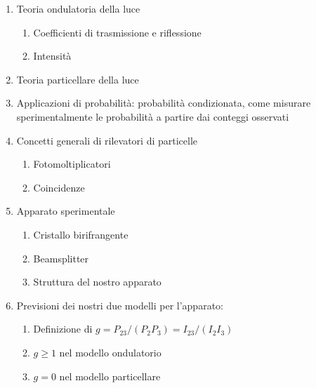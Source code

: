 \documentclass[main.tex]{subfiles}
\begin{document}
\begin{enumerate}
    \item Teoria ondulatoria della luce
    \begin{enumerate}
        \item Coefficienti di trasmissione e riflessione
        \item Intensità
    \end{enumerate}
    \item Teoria particellare della luce
    \item Applicazioni di probabilità: probabilità condizionata, come misurare sperimentalmente le probabilità a partire dai conteggi osservati
    \item Concetti generali di rilevatori di particelle
    \begin{enumerate}
        \item Fotomoltiplicatori
        \item Coincidenze
    \end{enumerate}
    \item Apparato sperimentale
    \begin{enumerate}
        \item Cristallo birifrangente
        \item Beamsplitter
        \item Struttura del nostro apparato
    \end{enumerate}
    \item Previsioni dei nostri due modelli per l'apparato:
    \begin{enumerate}
        \item Definizione di \(g = P_{23}/(P_2 P_3) = I_{23}/(I_2 I_3)\)
        \item \(g \geq 1\) nel modello ondulatorio
        \item \(g = 0\) nel modello particellare
    \end{enumerate}
\end{enumerate}
\end{document}
